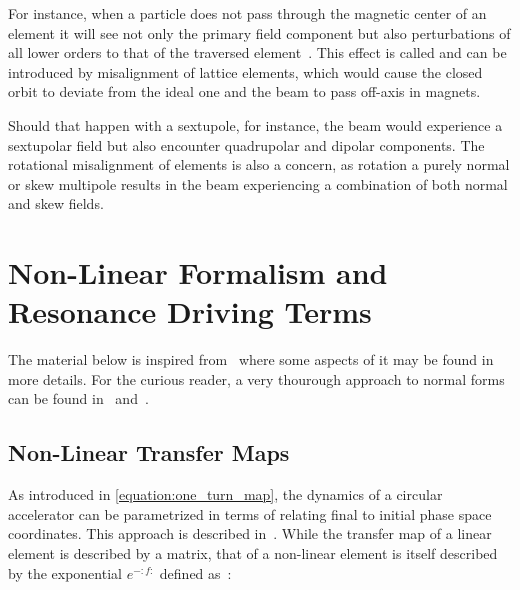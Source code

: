 For instance, when a particle does not pass through the magnetic center of an element it will see not only the primary field component but also perturbations of all lower orders to that of the traversed element~\cite{BOOK:Wiedemann:Particle_Accelerator_Physics}.
This effect is called  and can be introduced by misalignment of lattice elements, which would cause the closed orbit to deviate from the ideal one and the beam to pass off-axis in magnets.

Should that happen with a sextupole, for instance, the beam would experience a sextupolar field but also encounter quadrupolar and dipolar components.
The rotational misalignment of elements is also a concern, as rotation a purely normal or skew multipole results in the beam experiencing a combination of both normal and skew fields.


\section{Non-Linear Formalism and Resonance Driving Terms}
\label{section:non_linear_formalism_and_rdts}

The material below is inspired from~\cite{PHD:Tomas, PHD:Franchi,PHD:Maclean, PHD:Persson} where some aspects of it may be found in more details.
For the curious reader, a very thourough approach to normal forms can be found in~\cite{PRAB:Franchi:First_Simultaneous} and~\cite{PHD:Carlier}.

\subsection{Non-Linear Transfer Maps}
\label{subsection:non_linear_transfer_maps}

As introduced in \cref{equation:one_turn_map}, the dynamics of a circular accelerator can be parametrized in terms of  relating final to initial phase space coordinates.
This approach is described in~\cite{BOOK:Bazzani:Normal_Form_Approach_Betatron_Motion, JMP:Forest:Hamiltonian_Free_Description_Single_Particle_Dynamics}.
While the transfer map of a linear element is described by a matrix, that of a non-linear element is itself described by the exponential  \(e^{-:f:}\) defined as~\cite{BOOK:Wolski:Beam_dynamics}:


